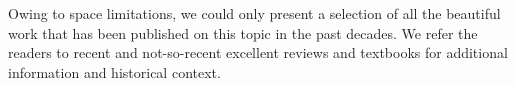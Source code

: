 Owing to space limitations, we could only present a selection of all
the beautiful work that has been published on this topic in the past
decades. We refer the readers to recent
\citep{Bar10,Ell10,Tre10,TMC12,Jackson:2013p30763,Jac15,T+E15}
and not-so-recent \citep{B+N92,CSS02,K+S04,Fal05,SKW06}
excellent reviews and textbooks \citep{SEF92} for additional
information and historical context.
